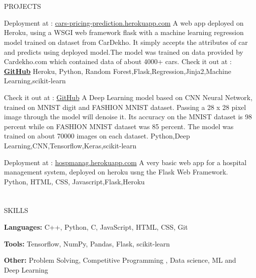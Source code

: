 \documentclass{my_cv}
\begin{document}
\begin{multicols}{2}
\section{\faPencil}{PROJECTS}
    
%
    {Deployment at : {\href{https://cars-pricing-prediction.herokuapp.com/}{cars-pricing-prediction.herokuapp.com}}}
    {A web app deployed on Heroku, using a WSGI web framework flask with a machine learning regression model trained on dataset from CarDekho. It simply accepts the attributes of car and predicts using deployed model.The model was trained on data provided by Cardekho.com which contained data of about 4000+ cars. Check it out at : {\textbf{\href{https://github.com/AnkitDevri/carPricePrediction}{GitHub}}} 
    }
    {Heroku, Python, Random Forest,Flask,Regression,Jinja2,Machine Learning,scikit-learn}
    \par
%
    {Check it out at : {\href{https://github.com/AnkitDevri/Denosing-Autoencoder}{GitHub}} 
    }%
    {A Deep Learning model based on CNN Neural Network, trained on MNIST digit and FASHION MNIST dataset.
     Passing a 28 x 28 pixel image through the model will denoise it. Its accuracy on the MNIST dataset is 98 percent while on FASHION MNIST dataset was 85 percent. The model was trained on about 70000 images on each dataset.}%
    {Python,Deep Learning,CNN,Tensorflow,Keras,scikit-learn}
    \par
{}%
    {Deployment at : {\href{https://hospmanag.herokuapp.com/}{hospmanag.herokuapp.com}}}%
    {A very basic web app for a hospital management system, deployed on heroku usng the Flask Web Framework. }%
    {Python, HTML, CSS, Javascript,Flask,Heroku}
     

    
    
\section{\faList}{SKILLS}

\textbf{Languages:} C++, Python, C, JavaScript, HTML, CSS, Git

\noindent\textbf{Tools:} Tensorflow, NumPy, Pandas, Flask, scikit-learn

\noindent\textbf{Other:} Problem Solving, Competitive Programming , Data science, ML and Deep Learning

\columnbreak


\end{multicols}
\end{document}
